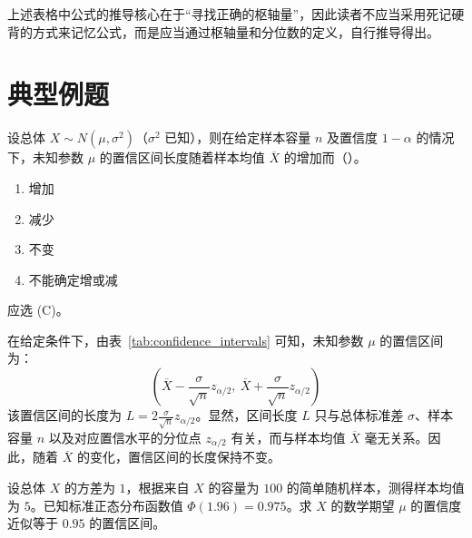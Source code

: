 \documentclass[lang=cn,11pt]{elegantbook}
\begin{document}
\begin{remark}
上述表格中公式的推导核心在于“寻找正确的枢轴量”，因此读者不应当采用死记硬背的方式来记忆公式，而是应当通过枢轴量和分位数的定义，自行推导得出。
\end{remark}

\section{典型例题}

\begin{exercise} \label{ex:ci_length}
设总体 $X \sim N(\mu,\sigma^2)$（$\sigma^2$ 已知），则在给定样本容量 $n$ 及置信度 $1-\alpha$ 的情况下，未知参数 $\mu$ 的置信区间长度随着样本均值 $\overline{X}$ 的增加而（\qquad）。
\begin{enumerate}
  \item[(A)] 增加
  \item[(B)] 减少
  \item[(C)] 不变
  \item[(D)] 不能确定增或减
\end{enumerate}
\end{exercise}

\begin{solution}
应选 (C)。

在给定条件下，由表~\ref{tab:confidence_intervals} 可知，未知参数 $\mu$ 的置信区间为：
\begin{equation*}
\left( \overline{X} - \frac{\sigma}{\sqrt{n}} z_{\alpha/2},\ \overline{X} + \frac{\sigma}{\sqrt{n}} z_{\alpha/2} \right)
\end{equation*}
该置信区间的长度为 $L = 2\frac{\sigma}{\sqrt{n}} z_{\alpha/2}$。显然，区间长度 $L$ 只与总体标准差 $\sigma$、样本容量 $n$ 以及对应置信水平的分位点 $z_{\alpha/2}$ 有关，而与样本均值 $\overline{X}$ 毫无关系。因此，随着 $\overline{X}$ 的变化，置信区间的长度保持不变。
\end{solution}

\begin{exercise} \label{ex:ci_large_sample}
设总体 $X$ 的方差为 $1$，根据来自 $X$ 的容量为 $100$ 的简单随机样本，测得样本均值为 $5$。已知标准正态分布函数值 $\Phi(1.96)=0.975$。求 $X$ 的数学期望 $\mu$ 的置信度近似等于 $0.95$ 的置信区间。
\end{exercise}
\end{document}
